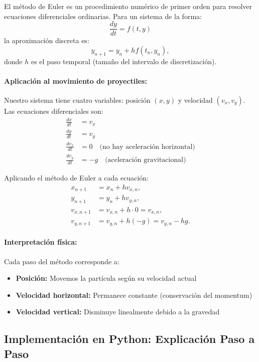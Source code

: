 \documentclass[12pt,a4paper]{article}
\begin{document}
El método de Euler es un procedimiento numérico de primer orden para resolver ecuaciones diferenciales ordinarias. Para un sistema de la forma:
\[
\frac{dy}{dt} = f(t, y)
\]
la aproximación discreta es:
\[
y_{n+1} = y_n + h f(t_n, y_n),
\]
donde $h$ es el paso temporal (tamaño del intervalo de discretización).

\paragraph{Aplicación al movimiento de proyectiles:} Nuestro sistema tiene cuatro variables: posición $(x, y)$ y velocidad $(v_x, v_y)$. Las ecuaciones diferenciales son:
\begin{align*}
\frac{dx}{dt} &= v_x \\
\frac{dy}{dt} &= v_y \\
\frac{dv_x}{dt} &= 0 \quad \text{(no hay aceleración horizontal)} \\
\frac{dv_y}{dt} &= -g \quad \text{(aceleración gravitacional)}
\end{align*}

Aplicando el método de Euler a cada ecuación:
\begin{align*}
x_{n+1} &= x_n + h v_{x,n}, \\
y_{n+1} &= y_n + h v_{y,n}, \\
v_{x,n+1} &= v_{x,n} + h \cdot 0 = v_{x,n}, \\
v_{y,n+1} &= v_{y,n} + h (-g) = v_{y,n} - h g.
\end{align*}

\paragraph{Interpretación física:} Cada paso del método corresponde a:
\begin{itemize}
\item \textbf{Posición:} Movemos la partícula según su velocidad actual
\item \textbf{Velocidad horizontal:} Permanece constante (conservación del momentum)
\item \textbf{Velocidad vertical:} Disminuye linealmente debido a la gravedad
\end{itemize}

\subsection*{Implementación en Python: Explicación Paso a Paso}
\end{document}
